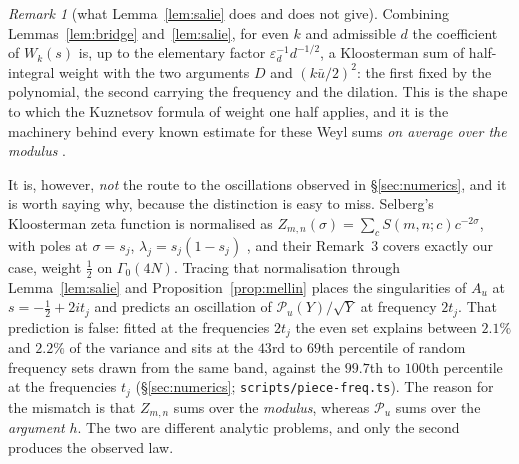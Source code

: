 \documentclass[11pt,a4paper]{article}
\theoremstyle{remark}\newtheorem{remark}[theorem]{Remark}
\begin{document}
\begin{remark}[what Lemma~\ref{lem:salie} does and does not give]\label{rem:achieved}
Combining Lemmas~\ref{lem:bridge} and~\ref{lem:salie}, for even $k$ and admissible $d$ the coefficient of $W_k(s)$
is, up to the elementary factor $\varepsilon_d^{-1}d^{-1/2}$, a Kloosterman sum of half-integral weight with the two
arguments $D$ and $(k\bar u/2)^2$: the first fixed by the polynomial, the second carrying the frequency and the
dilation. This is the shape to which the Kuznetsov formula of weight one half applies, and it is the machinery behind
every known estimate for these Weyl sums \emph{on average over the modulus} \cite{Hooley1963,DFI1995,DFI2012}.

It is, however, \emph{not} the route to the oscillations observed in \S\ref{sec:numerics}, and it is worth saying
why, because the distinction is easy to miss. Selberg's Kloosterman zeta function is normalised as
$Z_{m,n}(\sigma)=\sum_cS(m,n;c)c^{-2\sigma}$, with poles at $\sigma=s_j$, $\lambda_j=s_j(1-s_j)$
\cite[Theorem~1]{GoldfeldSarnak1983}, and their Remark~3 covers exactly our case, weight $\tfrac12$ on
$\Gamma_0(4N)$. Tracing that normalisation through Lemma~\ref{lem:salie} and Proposition~\ref{prop:mellin} places the
singularities of $A_u$ at $s=-\tfrac12+2it_j$ and predicts an oscillation of $\mathcal P_u(Y)/\sqrt Y$ at
frequency $2t_j$. That prediction is false: fitted at the frequencies $2t_j$ the even set explains between $2.1\%$
and $2.2\%$ of the variance and sits at the $43$rd to $69$th percentile of random frequency sets drawn from the same
band, against the $99.7$th to $100$th percentile at the frequencies $t_j$ (\S\ref{sec:numerics};
\texttt{scripts/piece-freq.ts}). The reason for the mismatch is that $Z_{m,n}$ sums over the \emph{modulus}, whereas
$\mathcal P_u$ sums over the \emph{argument} $h$. The two are different analytic problems, and only the second
produces the observed law.
\end{remark}
\end{document}
